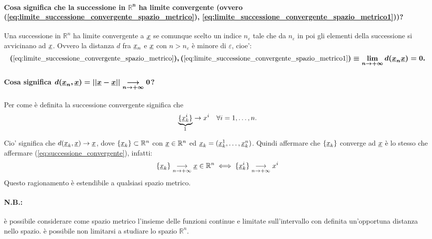 \paragraph{Cosa significa che la successione in $\boldsymbol{\mathbb R^n}$ ha limite convergente (ovvero (\ref{eq:limite_successione_convergente_spazio_metrico}), \ref{eq:limite_successione_convergente_spazio_metrico1}))?} Una successione in $\mathbb R^n$ ha limite convergente a $\uline x$ se comunque scelto un indice $n_\varepsilon$ tale che da $n_\varepsilon$ in poi gli elementi della successione si avvicinano ad $\uline x$. Ovvero la distanza $d$ fra $\uline x_n$ e $\uline x$ con $n>n_\varepsilon$ è minore di $\varepsilon$, cioe':
\begin{equation*}
    \boldsymbol{(\ref{eq:limite_successione_convergente_spazio_metrico}),(\ref{eq:limite_successione_convergente_spazio_metrico1})\equiv\lim\limits_{n\rightarrow+\infty}d(\uline x_n\uline x)=0.}
\end{equation*}

\paragraph{Cosa significa $\boldsymbol{d(\uline x_n,\uline x)=||\uline x-\uline x||\underset{n\rightarrow+\infty}{\longrightarrow}0}$?} Per come è definita la successione convergente significa che
\begin{equation}\label{eq:successione_convergente}
    \underbrace{\{\uline x_k^i\}}_{\footnotemark}\rightarrow x^i\quad\forall i=1,\hdots,n.
\end{equation}
Cio' significa che $d(\uline x_k,\uline x)\rightarrow\uline x$, dove $\{\uline x_k\}\subset\mathbb R^n$ con $\uline x\in\mathbb R^n$ ed $\uline x_k=(\uline x_k^1,\hdots,\uline x_k^n)$. Quindi affermare che $\{\uline x_k\}$ converge ad $\uline x$ è lo stesso che affermare (\ref{eq:successione_convergente}), infatti:
\begin{equation*}
    \{\uline x_k\}\underset{n\rightarrow+\infty}{\longrightarrow}\uline x\in\mathbb R^n\iff\{\uline x_k^i\}\underset{n\rightarrow+\infty}{\longrightarrow}x^i
\end{equation*}
Questo ragionamento è estendibile a qualsiasi spazio metrico.

\paragraph{N.B.:} è possibile considerare come spazio metrico l'insieme delle funzioni continue e limitate sull'intervallo con definita un'opportuna distanza nello spazio. è possibile non limitarsi a studiare lo spazio $\mathbb R^n$.


